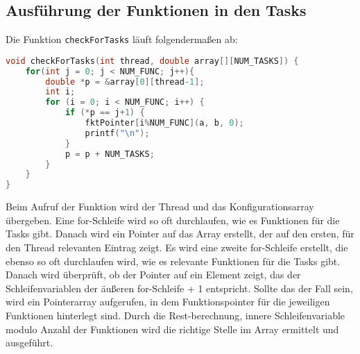\subsection{Ausführung der Funktionen in den Tasks}

Die Funktion \texttt{checkForTasks} läuft folgendermaßen ab:
\begin{lstlisting}[language=C]
void checkForTasks(int thread, double array[][NUM_TASKS]) {
    for(int j = 0; j < NUM_FUNC; j++){
        double *p = &array[0][thread-1];
        int i;
        for (i = 0; i < NUM_FUNC; i++) {
            if (*p == j+1) {
                fktPointer[i%NUM_FUNC](a, b, 0);
                printf("\n");
            }
            p = p + NUM_TASKS;
        }
    }
}
\end{lstlisting}

Beim Aufruf der Funktion wird der Thread und das Konfigurationsarray übergeben. Eine for-Schleife wird so oft durchlaufen, wie es Funktionen für die Tasks gibt. Danach wird ein Pointer auf das Array erstellt, der auf den ersten, für den Thread relevanten Eintrag zeigt. 
Es wird eine zweite for-Schleife erstellt, die ebenso so oft durchlaufen wird, wie es relevante Funktionen für die Tasks gibt. Danach wird überprüft, ob der Pointer auf ein Element zeigt, das der Schleifenvariablen der äußeren for-Schleife + 1 entspricht. Sollte das der Fall sein, wird ein Pointerarray aufgerufen, in dem Funktionspointer für die jeweiligen Funktionen hinterlegt sind. Durch die Rest-berechnung, innere Schleifenvariable  modulo  Anzahl der Funktionen wird die richtige Stelle im Array ermittelt und ausgeführt. 
